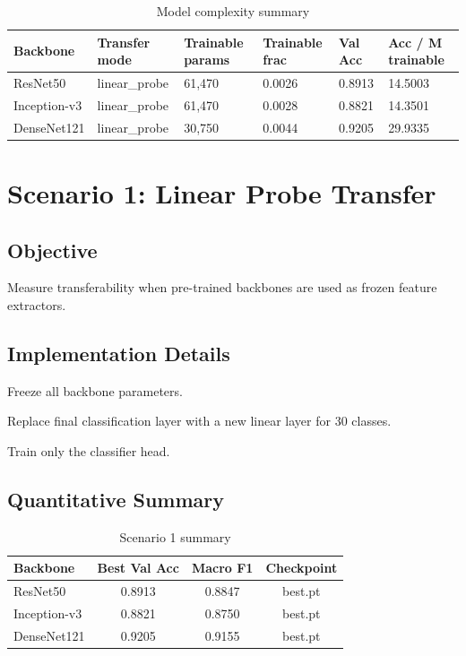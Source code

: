 \documentclass[11pt,a4paper]{report}
\renewenvironment{leftbar}[1][\hsize]
  {\def\FrameCommand{{\color{subsectionblue}\vrule width 3pt}\hspace{0pt}}%
   \MakeFramed{\hsize#1\advance\hsize-\width\FrameRestore}}
  {\endMakeFramed}
\renewenvironment{itemize}{\begin{leftbar}\begin{originalitemize}}{\end{originalitemize}\end{leftbar}}
\begin{document}
\begin{table}[H]
\centering
\caption{Model complexity summary}
\label{tab:model-complexity}
\begin{tabular}{llllll}
\toprule
\rowcolor{tableheader}
\textbf{Backbone} & \textbf{Transfer mode} & \textbf{Trainable params} & \textbf{Trainable frac} & \textbf{Val Acc} & \textbf{Acc / M trainable} \\
\midrule
ResNet50 & linear\_probe & 61,470 & 0.0026 & 0.8913 & 14.5003 \\
Inception-v3 & linear\_probe & 61,470 & 0.0028 & 0.8821 & 14.3501 \\
DenseNet121 & linear\_probe & 30,750 & 0.0044 & 0.9205 & 29.9335 \\
\bottomrule
\end{tabular}
\end{table}

\chapter{Scenario 1: Linear Probe Transfer}

\section{Objective}
Measure transferability when pre-trained backbones are used as frozen feature extractors.

\section{Implementation Details}
\begin{itemize}
  \item Freeze all backbone parameters.
  \item Replace final classification layer with a new linear layer for 30 classes.
  \item Train only the classifier head.
\end{itemize}

\section{Quantitative Summary}
\begin{table}[H]
\centering
\caption{Scenario 1 summary}
\label{tab:s1-summary}
\begin{tabular}{lccc}
\toprule
\rowcolor{tableheader}
\textbf{Backbone} & \textbf{Best Val Acc} & \textbf{Macro F1} & \textbf{Checkpoint} \\
\midrule
ResNet50 & 0.8913 & 0.8847 & best.pt \\
Inception-v3 & 0.8821 & 0.8750 & best.pt \\
DenseNet121 & 0.9205 & 0.9155 & best.pt \\
\bottomrule
\end{tabular}
\end{table}
\end{document}
